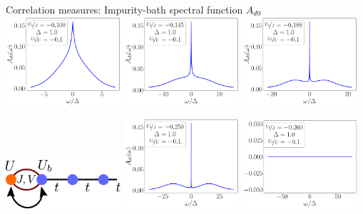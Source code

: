 \documentclass[aspectratio=169]{beamer}
\begin{document}
\begin{frame}[noframenumbering]{Correlation measures: Impurity-bath spectral function \(A_{d0}\)}
\centering
\includegraphics[width=0.32\textwidth]{./figures/spec_func_d0_Ub_by_J=-0.100.pdf}
\includegraphics[width=0.32\textwidth]{./figures/spec_func_d0_Ub_by_J=-0.145.pdf}
\includegraphics[width=0.32\textwidth]{./figures/spec_func_d0_Ub_by_J=-0.188.pdf}

\includegraphics[width=0.32\textwidth]{./figures/sf_pointer3.pdf}
\includegraphics[width=0.32\textwidth]{./figures/spec_func_d0_Ub_by_J=-0.250.pdf}
\includegraphics[width=0.32\textwidth]{./figures/spec_func_d0_Ub_by_J=-0.26.pdf}
\end{frame}
\end{document}
